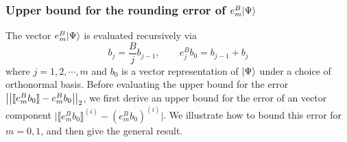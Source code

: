 \subsubsection{Upper bound for the rounding error of  $e^B_m|\Psi\rangle$}
The vector $e^B_m|\Psi\rangle$ is evaluated recursively via
\begin{equation}
\label{recursive relation 1}
    b_j= \frac{B}{j}b_{j-1},\qquad e^B_j b_0=b_{j-1}+b_j
\end{equation}
where $j=1,2,\cdots,m$ and $b_0$ is a vector representation of $|\Psi\rangle$ under a choice of orthonormal basis. Before evaluating the upper bound for the error $\left|\left|\llbracket e^B_mb_0\rrbracket-e^B_mb_0\right|\right|_2$, we first derive an upper bound for the error of an vector component $\big|\llbracket e^B_mb_0 \rrbracket^{(i)}-(e^B_mb_0) ^{(i)}\big|$. We illustrate how to bound this error for $m=0,1$, and then give the general result.

